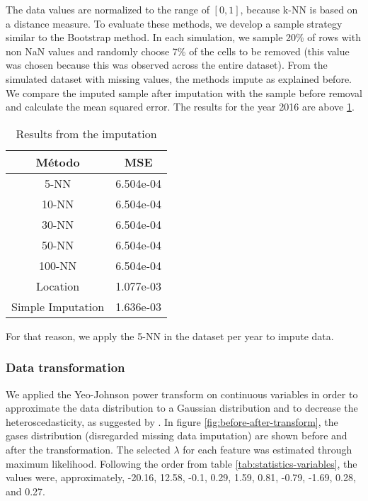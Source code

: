 The data values are normalized to the range of $[0,1]$, because k-NN is based
on a distance measure. To evaluate these methods, we develop a sample strategy
similar to the Bootstrap method. In each simulation, we sample 20\% of rows with
non NaN values and randomly choose 7\% of the cells to be removed (this value
was chosen because this was observed across the entire dataset). From the simulated
dataset with missing values, the methods impute as explained before. We
compare the imputed sample after imputation with the sample before removal and calculate
the mean squared error. The results for the year 2016 are above \ref{tab:result-imputation}. 

\begin{table}[!hb]
    \centering
    \begin{tabular}{|c|c|}
    \hline
    \textbf{Método}   & \textbf{MSE} \\ \hline
    5-NN              & 6.504e-04    \\ \hline
    10-NN             & 6.504e-04    \\ \hline
    30-NN             & 6.504e-04    \\ \hline
    50-NN             & 6.504e-04    \\ \hline
    100-NN            & 6.504e-04    \\ \hline
    Location          & 1.077e-03    \\ \hline
    Simple Imputation & 1.636e-03    \\ \hline
    \end{tabular}
    \caption{Results from the imputation}
    \label{tab:result-imputation}
\end{table}

For that reason, we apply the 5-NN in the dataset per year to impute data. 

\subsubsection{Data transformation}

We applied the Yeo-Johnson power transform \cite{yeo2000} on continuous
variables in order to approximate the data distribution to a Gaussian
distribution and to
decrease the heteroscedasticity, as suggested by \cite{gocheva2014}. In figure
\ref{fig:before-after-transform}, the gases distribution (disregarded
missing data imputation) are shown before and after the transformation. The
selected $\lambda$ for each feature was estimated through maximum likelihood.
Following the order from table \ref{tab:statistics-variables}, the values
were, approximately, 
-20.16, 12.58, -0.1, 0.29, 1.59, 0.81, -0.79, -1.69, 0.28, and 0.27.

